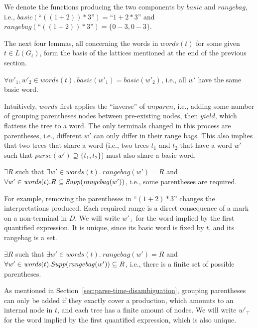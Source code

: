\documentclass[acmsmall,review,anonymous]{acmart}\settopmatter{printfolios=true,printccs=false,printacmref=false}
\newcommand{\support}{\mathit{Supp}}
\newcommand{\yield}{\mathit{yield}} %
\newcommand{\semantic}{\mathit{unparen}} %
\newcommand{\parse}{\mathit{parse}} %
\newcommand{\words}{\mathit{words}} %
\newcommand{\alt}{\mathit{alt}} %
\newcommand{\basic}{\mathit{basic}} %
\newcommand{\rangebag}{\mathit{rangebag}} %
\newcommand{\range}[2]{#1\!-\!#2}
\begin{document}
We denote the functions producing the two components by $\basic$ and $\rangebag$, i.e., $\basic(\text{``}((1 + 2)) * 3\text{''}) = \text{``}1 + 2 * 3\text{''}$ and $\rangebag(\text{``}((1 + 2)) * 3\text{''}) = \{\range{0}{3}, \range{0}{3}\}$.

The next four lemmas, all concerning the words in $\words(t)$ for some given $t \in L(G_t)$, form the basis of the lattices mentioned at the end of the previous section.

\begin{lemma}
  $\forall w'_1, w'_2 \in \words(t).\ \basic(w'_1) = \basic(w'_2)$, i.e., all $w'$ have the same basic word.
  \label{lemma:same-basic}
\end{lemma}
\noindent Intuitively, $\words$ first applies the ``inverse'' of $\semantic$, i.e., adding some number of grouping parentheses nodes between pre-existing nodes, then $\yield$, which flattens the tree to a word. The only terminals changed in this process are parentheses, i.e., different $w'$ can only differ in their range bags. This also implies that two trees that share a word (i.e., two trees $t_1$ and $t_2$ that have a word $w'$ such that $\parse(w') \supseteq \{t_1, t_2\}$) must also share a basic word.

\begin{lemma}
  $\exists R$ such that $\exists w' \in \words(t).\ \rangebag(w') = R$ and $\forall w' \in \words(t).\\ R \subseteq \support(\rangebag(w'))$, i.e., some parentheses are required.
  \label{lemma:required-parentheses}
\end{lemma}
\noindent For example, removing the parentheses in ``$(1 + 2) * 3$'' changes the interpretations produced. Each required range is a direct consequence of a mark on a non-terminal in $D$. We will write $w'_\bot$ for the word implied by the first quantified expression. It is unique, since its basic word is fixed by $t$, and its rangebag is a set.

\begin{lemma}
  $\exists R$ such that $\exists w' \in \words(t).\ \rangebag(w') = R$ and $\forall w' \in \words(t).\\ \support(\rangebag(w')) \subseteq R$, i.e., there is a finite set of possible parentheses.
  \label{lemma:possible-parentheses}
\end{lemma}
\noindent As mentioned in Section~\ref{sec:parse-time-disambiguation}, grouping parentheses can only be added if they exactly cover a production, which amounts to an internal node in $t$, and each tree has a finite amount of nodes. We will write $w'_\top$ for the word implied by the first quantified expression, which is also unique.
\end{document}
